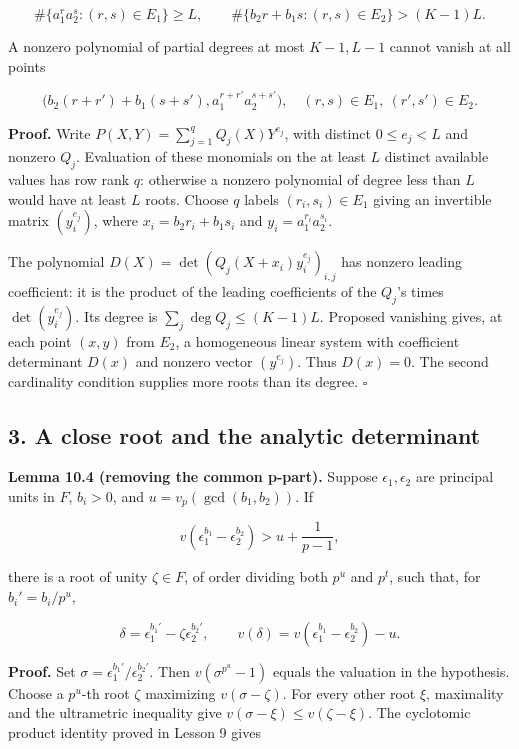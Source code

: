 \documentclass[
  11pt,
  a4paper,
]{article}
\begin{document}
\[
\#\{a_1^ra_2^s:(r,s)\in E_1\}\ge L,
\qquad
\#\{b_2r+b_1s:(r,s)\in E_2\}>(K-1)L.
\tag{10.7}
\]

A nonzero polynomial of partial degrees at most \(K-1,L-1\) cannot
vanish at all points

\[
\bigl(b_2(r+r')+b_1(s+s'),a_1^{r+r'}a_2^{s+s'}\bigr),
\quad (r,s)\in E_1,\ (r',s')\in E_2.
\]

\textbf{Proof.} Write \(P(X,Y)=\sum_{j=1}^q Q_j(X)Y^{e_j}\), with
distinct \(0\le e_j<L\) and nonzero \(Q_j\). Evaluation of these
monomials on the at least \(L\) distinct available values has row rank
\(q\): otherwise a nonzero polynomial of degree less than \(L\) would
have at least \(L\) roots. Choose \(q\) labels \((r_i,s_i)\in E_1\)
giving an invertible matrix \((y_i^{e_j})\), where \(x_i=b_2r_i+b_1s_i\)
and \(y_i=a_1^{r_i}a_2^{s_i}\).

The polynomial \(D(X)=\det(Q_j(X+x_i)y_i^{e_j})_{i,j}\) has nonzero
leading coefficient: it is the product of the leading coefficients of
the \(Q_j\)'s times \(\det(y_i^{e_j})\). Its degree is
\(\sum_j\deg Q_j\le(K-1)L\). Proposed vanishing gives, at each point
\((x,y)\) from \(E_2\), a homogeneous linear system with coefficient
determinant \(D(x)\) and nonzero vector \((y^{e_j})\). Thus \(D(x)=0\).
The second cardinality condition supplies more roots than its degree.
\(\square\)

\subsection{3. A close root and the analytic
determinant}\label{a-close-root-and-the-analytic-determinant}

\textbf{Lemma 10.4 (removing the common p-part).} Suppose
\(\epsilon_1,\epsilon_2\) are principal units in \(F\), \(b_i>0\), and
\(u=v_p(\gcd(b_1,b_2))\). If

\[
v(\epsilon_1^{b_1}-\epsilon_2^{b_2})>u+\frac1{p-1},
\]

there is a root of unity \(\zeta\in F\), of order dividing both \(p^u\)
and \(p^t\), such that, for \(b_i'=b_i/p^u\),

\[
\delta=\epsilon_1^{b_1'}-\zeta\epsilon_2^{b_2'},
\qquad
v(\delta)=v(\epsilon_1^{b_1}-\epsilon_2^{b_2})-u.
\tag{10.8}
\]

\textbf{Proof.} Set \(\sigma=\epsilon_1^{b_1'}/\epsilon_2^{b_2'}\). Then
\(v(\sigma^{p^u}-1)\) equals the valuation in the hypothesis. Choose a
\(p^u\)-th root \(\zeta\) maximizing \(v(\sigma-\zeta)\). For every
other root \(\xi\), maximality and the ultrametric inequality give
\(v(\sigma-\xi)\le v(\zeta-\xi)\). The cyclotomic product identity
proved in Lesson 9 gives
\end{document}
